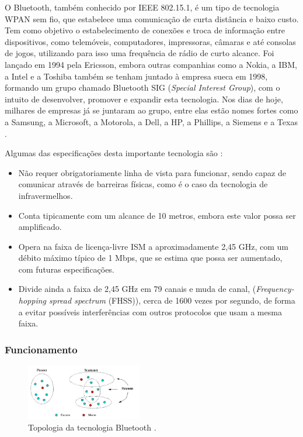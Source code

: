 \documentclass[conference]{IEEEtran}
\begin{document}
O Bluetooth, também conhecido por IEEE 802.15.1, é um tipo de tecnologia WPAN sem fio, que estabelece uma comunicação de curta distância e baixo custo. 
Tem como objetivo o estabelecimento de conexões e troca de informação entre dispositivos, como telemóveis, computadores, impressoras, câmaras e até consolas de jogos, utilizando para isso uma frequência de rádio de curto alcance. 
Foi lançado em 1994 pela Ericsson, embora outras companhias como a Nokia, a IBM, a Intel e a Toshiba também se tenham juntado à empresa sueca em 1998, formando um grupo chamado Bluetooth SIG (\textit{Special Interest Group}), com o intuito de desenvolver, promover e expandir esta tecnologia. 
Nos dias de hoje, milhares de empresas já se juntaram ao grupo, entre elas estão nomes fortes como a Samsung, a Microsoft, a Motorola, a Dell, a HP, a Phillips, a Siemens e a Texas \cite{bluetoothwiki}.

Algumas das especificações desta importante tecnologia são \cite{kobayashi2004tecnologia}:

\begin{itemize}

 \item Não requer obrigatoriamente linha de vista para funcionar, sendo capaz de comunicar através de barreiras físicas, como é o caso da tecnologia de infravermelhos.
 \item Conta tipicamente com um alcance de 10 metros, embora este valor possa ser amplificado. 
 \item Opera na faixa de licença-livre ISM a aproximadamente 2,45 GHz, com um débito máximo típico de 1 Mbps, que se estima que possa ser aumentado, com futuras especificações.
 \item Divide ainda a faixa de 2,45 GHz em 79 canais e muda de canal, (\textit{Frequency-hopping spread spectrum} (FHSS)), cerca de 1600 vezes por segundo, de forma a evitar possíveis interferências com outros protocolos que usam a mesma faixa.

\end{itemize}

\subsubsection{Funcionamento}

\begin{figure}[!t]
  \centering
  \includegraphics[width=0.45\textwidth]{Esquema_Bluetooth.png}
  \caption{Topologia da tecnologia Bluetooth \cite{blueesptec}.}
  \label{fig:topBluet}
\end{figure}
\end{document}
